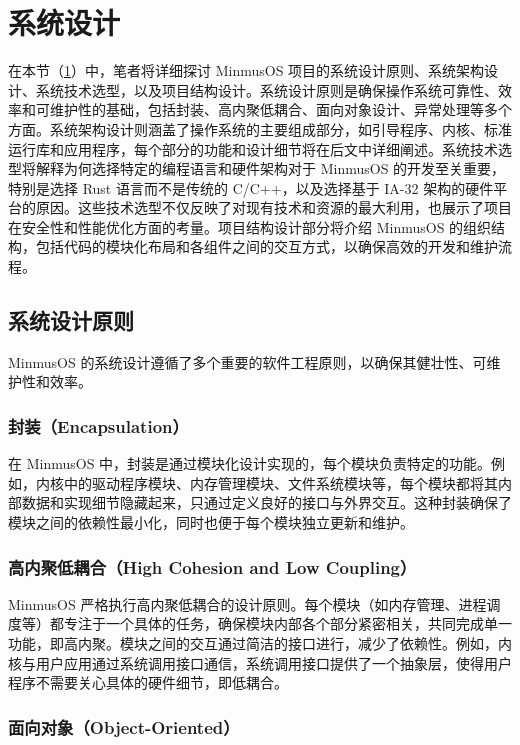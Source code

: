 \section{系统设计}\label{sec:SystemDesign}

在本节（\cref{sec:SystemDesign}）中，笔者将详细探讨 MinmusOS 项目的系统设计原则、系统架构设计、系统技术选型，以及项目结构设计。系统设计原则是确保操作系统可靠性、效率和可维护性的基础，包括封装、高内聚低耦合、面向对象设计、异常处理等多个方面。系统架构设计则涵盖了操作系统的主要组成部分，如引导程序、内核、标准运行库和应用程序，每个部分的功能和设计细节将在后文中详细阐述。系统技术选型将解释为何选择特定的编程语言和硬件架构对于 MinmusOS 的开发至关重要，特别是选择 Rust 语言而不是传统的 C/C++，以及选择基于 IA-32 架构的硬件平台的原因。这些技术选型不仅反映了对现有技术和资源的最大利用，也展示了项目在安全性和性能优化方面的考量。项目结构设计部分将介绍 MinmusOS 的组织结构，包括代码的模块化布局和各组件之间的交互方式，以确保高效的开发和维护流程。

\subsection{系统设计原则}

MinmusOS 的系统设计遵循了多个重要的软件工程原则，以确保其健壮性、可维护性和效率。

\subsubsection{封装（Encapsulation）}

在 MinmusOS 中，封装是通过模块化设计实现的，每个模块负责特定的功能。例如，内核中的驱动程序模块、内存管理模块、文件系统模块等，每个模块都将其内部数据和实现细节隐藏起来，只通过定义良好的接口与外界交互。这种封装确保了模块之间的依赖性最小化，同时也便于每个模块独立更新和维护。

\subsubsection{高内聚低耦合（High Cohesion and Low Coupling）}

MinmusOS 严格执行高内聚低耦合的设计原则。每个模块（如内存管理、进程调度等）都专注于一个具体的任务，确保模块内部各个部分紧密相关，共同完成单一功能，即高内聚。模块之间的交互通过简洁的接口进行，减少了依赖性。例如，内核与用户应用通过系统调用接口通信，系统调用接口提供了一个抽象层，使得用户程序不需要关心具体的硬件细节，即低耦合。

\subsubsection{面向对象（Object-Oriented）}

